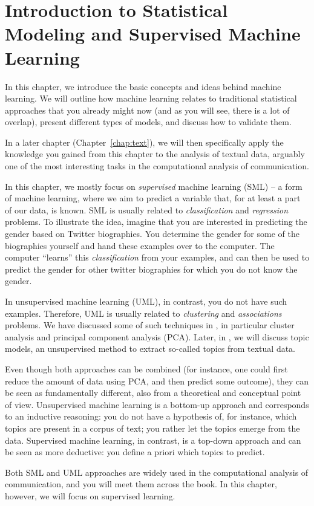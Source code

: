 \chapter{Introduction to Statistical Modeling and Supervised Machine Learning}
\label{chap:introsml}
In this chapter, we introduce the basic concepts and ideas behind
machine learning.  We will outline how machine learning relates to
traditional statistical approaches that you already might now (and as
you will see, there is a lot of overlap), present different types of
models, and discuss how to validate them.

In a later chapter (Chapter~\ref{chap:text}), we will then
specifically apply the knowledge you gained from this chapter to the
analysis of textual data, arguably one of the most interesting tasks
in the computational analysis of communication.

In this chapter, we mostly focus on \emph{supervised} machine learning (SML) 
-- a form of machine learning, where we aim to predict a variable
that, for at least a part of our data, is known. SML is usually related to \textit{classification} and \textit{regression}  problems. To illustrate the
idea, imagine that you are interested in predicting the gender based
on Twitter biographies. You determine the gender for some of the
biographies yourself and hand these examples over to the computer. The
computer ``learns'' this \textit{classification} from your examples, and can then be used to predict the gender for other twitter biographies for which you do not
know the gender.

In unsupervised machine learning (UML), in contrast, you do not have such
examples. Therefore, UML is usually related to \textit{clustering} and \textit{associations} problems. We have discussed some of such techniques in , in particular cluster analysis and
principal component analysis (PCA).
Later, in , we will discuss topic models, an unsupervised method to extract so-called topics from textual data.



Even though both approaches can be combined (for instance, one could
first reduce the amount of data using PCA, and then predict some
outcome), they can be seen as fundamentally different, also from a
theoretical and conceptual point of view.  Unsupervised machine
learning is a bottom-up approach and corresponds to an inductive
reasoning: you do not have a hypothesis of, for instance, which topics
are present in a corpus of text; you rather let the topics emerge from
the data.  Supervised machine learning, in contrast, is a top-down
approach and can be seen as more deductive: you define a priori which
topics to predict.

Both SML and UML approaches are widely used in the computational analysis of communication, and you will meet them across the book.
In this chapter, however, we will focus on supervised learning.








